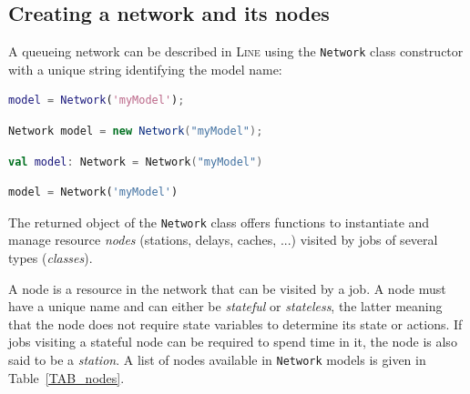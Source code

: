 \subsection{Creating a network and its nodes}
A queueing network can be described in \textsc{Line} using the \texttt{Network} class constructor with a unique string identifying the model name:
\begin{MATLAB}
\begin{lstlisting}[language = matlab]
model = Network('myModel');
\end{lstlisting}
\end{MATLAB}
\begin{JAVA}
\begin{lstlisting}[language = java, basicstyle=\ttfamily\scriptsize]
Network model = new Network("myModel");
\end{lstlisting}
\end{JAVA}
\begin{KOTLIN}
\begin{lstlisting}[language = kotlin, basicstyle=\ttfamily\scriptsize]
val model: Network = Network("myModel")
\end{lstlisting}
\end{KOTLIN}
\begin{PYTHON}
\begin{lstlisting}[language = python]
model = Network('myModel')
\end{lstlisting}
\end{PYTHON}
The returned object of the \texttt{Network} class offers functions to instantiate and manage resource \emph{nodes} (stations,  delays, caches, ...) visited by jobs of several types (\emph{classes}).

A {node} is a resource in the network that can be visited by a job. A node must have a unique name and can either be {\em stateful} or {\em stateless}, the latter meaning that the node does not require state variables to determine its state or actions. If jobs visiting a stateful node can be required to spend time in it, the node is also said to be a {\em station}. A list of nodes available in \texttt{Network} models is given in Table~\ref{TAB_nodes}.

